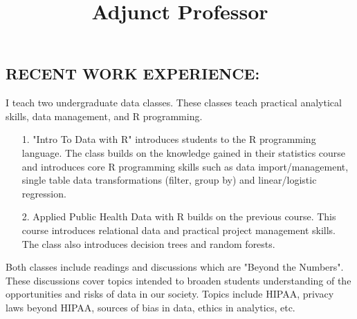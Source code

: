 \documentclass[line, mm, 10pt]{res}
\begin{document}
\address{\href{mailto:andy.choens@gmail.com}{andy.choens@gmail.com}}
\address{\href{tel:(518) 275-5984}{(518) 275-5984}}

\begin{resume}




\section{RECENT WORK EXPERIENCE:}


  \title{Adjunct Professor}
  \begin{position}
    I teach two undergraduate data classes. These classes teach practical
    analytical skills, data management, and R programming. 
    
    \begin{itemize}
      \item[1.] "Intro To Data with R" introduces students to the R programming
      language. The class builds on the knowledge gained in their statistics
      course and introduces core R programming skills such as data
      import/management, single table data transformations (filter, group by)
      and linear/logistic regression.
      \item[2.] Applied Public Health Data with R builds on the previous course.
      This course introduces relational data and practical project management
      skills. The class also introduces decision trees and random forests.
    \end{itemize}
  
    Both classes include readings and discussions which are "Beyond the
    Numbers". These discussions cover topics intended to broaden students
    understanding of the opportunities and risks of data in our society. Topics
    include HIPAA, privacy laws beyond HIPAA, sources of bias in data, ethics in
    analytics, etc.
  \end{position}


\end{resume}
\end{document}

